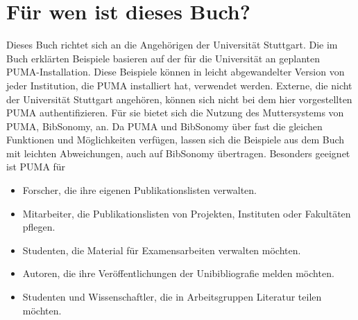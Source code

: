 \section{Für wen ist dieses Buch?} 
Dieses Buch richtet sich an die Angehörigen der Universität Stuttgart. Die im Buch erklärten Beispiele basieren auf der für die Universität  an geplanten PUMA-Installation. Diese Beispiele können in leicht abgewandelter Version von jeder Institution, die PUMA installiert hat, verwendet werden. \newline
Externe, die nicht der Universität Stuttgart angehören, können sich nicht bei dem hier vorgestellten PUMA authentifizieren. Für sie bietet sich die Nutzung des Muttersystems von PUMA, BibSonomy, an. Da PUMA und BibSonomy über fast die gleichen Funktionen und Möglichkeiten verfügen, lassen sich die Beispiele aus dem Buch mit leichten Abweichungen, auch auf BibSonomy übertragen.\newline
Besonders geeignet ist PUMA für
\begin{itemize}
\item Forscher, die ihre eigenen Publikationslisten verwalten.
\item Mitarbeiter, die Publikationslisten von Projekten, Instituten oder Fakultäten pflegen.
\item Studenten, die Material für Examensarbeiten verwalten möchten.
\item Autoren, die ihre Veröffentlichungen der Unibibliografie melden möchten.
\item Studenten und Wissenschaftler, die in Arbeitsgruppen Literatur teilen möchten.
\end{itemize}

